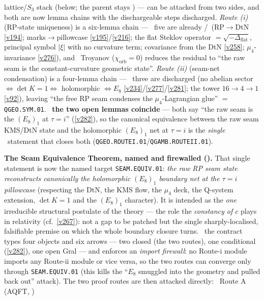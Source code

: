 lattice/$S_3$ stack (below; the parent stays \mO) --- can be attacked from two sides, and
both are now lemma chains with the dischargeable steps discharged. \emph{Route (i)} (RP-state uniqueness) is a
six-lemma chain --- \mE\ five are already \mE/\mO\ (RP$\to$DtN \vref{v194}; marks$\to$pillowcase
\vref{v195}/\vref{v216}; the flat Steklov operator $=\sqrt{-\Delta_{\mathrm{flat}}}$, principal symbol $|\xi|$
with no curvature term; covariance from the DtN \vref{v258}; $\mu_4$-invariance \vref{v276}), and \mC\ Troyanov
($\chi_{\mathrm{orb}}{=}0$) reduces the residual to ``the raw seam is the constant-curvature geometric state''.
\emph{Route (ii)} (seam-net condensation) is a four-lemma chain --- \mE\ three are discharged (no abelian sector
$\Leftrightarrow\det K{=}1\Leftrightarrow$ holomorphic $\Leftrightarrow E_8$ \vref{v234}/\vref{v277}/\vref{v281};
the tower $16{\to}4{\to}1$ \vref{v92}), leaving ``the free RP seam condenses the $\mu_4$-Lagrangian glue''
$=$\texttt{QGEO.SYM.01}. \mE\ \textbf{the two open lemmas coincide} --- both say ``the raw seam is the
$(E_8)_1$ at $\tau{=}i$'' (\vref{v282}), so the canonical equivalence between the raw seam KMS/DtN state and the
holomorphic $(E_8)_1$ net at $\tau{=}i$ is the \emph{single} \mO\ statement that closes both
(\texttt{QGEO.ROUTEI.01}/\texttt{QGAMB.ROUTEII.01}).
\par\smallskip\noindent\textbf{The Seam Equivalence Theorem, named and firewalled
().} That single statement is now the named target
\texttt{SEAM.EQUIV.01}: \emph{the raw RP seam state reconstructs canonically the holomorphic $(E_8)_1$ boundary
net at the $\tau{=}i$ pillowcase} (respecting the DtN, the KMS flow, the $\mu_4$ deck, the Q-system extension,
$\det K{=}1$ and the $(E_8)_1$ character). It is intended as the \emph{one} irreducible structural postulate of
the theory --- the role the \emph{constancy of $c$} plays in relativity (cf.\ \vref{v267}): not a gap to be
patched but the single sharply-localised, falsifiable premise on which the whole boundary closure turns.
\mE\ the contract types four objects and six arrows --- two closed
(the two routes), one conditional (\vref{v282}), one open Gral --- and enforces an \emph{import firewall}: no
Route-i module imports any Route-ii module or vice versa, so the two routes can converge only through
\texttt{SEAM.EQUIV.01} (this kills the ``$E_8$ smuggled into the geometry and pulled back out'' attack). The two
proof routes are then attacked directly: \mE\ Route A (AQFT, )
